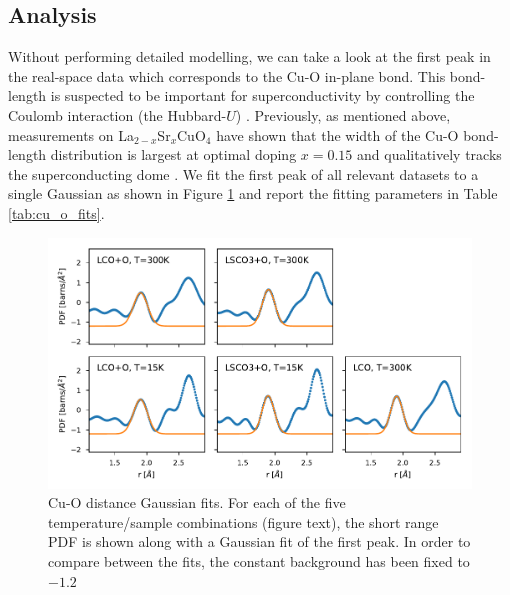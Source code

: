 \subsection{Analysis}
Without performing detailed modelling, we can take a look at the first peak in the real-space data which corresponds to the Cu-O in-plane bond. This bond-length is suspected to be important for superconductivity by controlling the Coulomb interaction (the Hubbard-$U$) \cite{Ivashko2019}. Previously, as mentioned above, measurements on La$_{2-x}$Sr$_x$CuO$_{4}$ have shown that the width of the Cu-O bond-length distribution is largest at optimal doping $x=0.15$ and qualitatively tracks the superconducting dome \cite{Bozin2000}. We fit the first peak of all relevant datasets to a single Gaussian as shown in Figure \ref{fig:cu_o_fits} and report the fitting parameters in Table \ref{tab:cu_o_fits}.

\begin{figure}
    \centering
    \includegraphics[width=\textwidth]{fig/pdf/cu_o_fits.pdf}
    \caption{Cu-O distance Gaussian fits. For each of the five temperature/sample combinations (figure text), the short range PDF is shown along with a Gaussian fit of the first peak. In order to compare between the fits, the constant background has been fixed to $-1.2$}
    \label{fig:cu_o_fits}
\end{figure}


